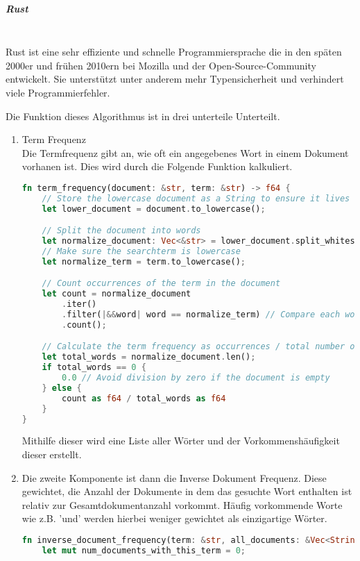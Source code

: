 \subparagraph{Rust}\mbox{}\\
Rust ist eine sehr effiziente und schnelle Programmiersprache die in den späten 2000er und frühen 2010ern bei Mozilla und der Open-Source-Community entwickelt. Sie unterstützt unter anderem mehr Typensicherheit und verhindert viele Programmierfehler.\cite{chatgpt}

Die Funktion dieses Algorithmus ist in drei unterteile Unterteilt.

\begin{enumerate}
    \item Term Frequenz \\
    Die Termfrequenz gibt an, wie oft ein angegebenes Wort in einem Dokument vorhanen ist. Dies wird durch die Folgende Funktion kalkuliert.
    
    \begin{lstlisting}[language=Rust]
fn term_frequency(document: &str, term: &str) -> f64 {
    // Store the lowercase document as a String to ensure it lives long enough
    let lower_document = document.to_lowercase(); 

    // Split the document into words
    let normalize_document: Vec<&str> = lower_document.split_whitespace().collect();
    // Make sure the searchterm is lowercase
    let normalize_term = term.to_lowercase();

    // Count occurrences of the term in the document
    let count = normalize_document
        .iter()
        .filter(|&&word| word == normalize_term) // Compare each word with the term
        .count();

    // Calculate the term frequency as occurrences / total number of words
    let total_words = normalize_document.len();
    if total_words == 0 {
        0.0 // Avoid division by zero if the document is empty
    } else {
        count as f64 / total_words as f64
    }
}\end{lstlisting}

    Mithilfe dieser wird eine Liste aller Wörter und der Vorkommenshäufigkeit dieser erstellt.

    \item Die zweite Komponente ist dann die Inverse Dokument Frequenz. Diese gewichtet, die Anzahl der Dokumente in dem das gesuchte Wort enthalten ist relativ zur Gesamtdokumentanzahl vorkommt. Häufig vorkommende Worte wie z.B. 'und' werden hierbei weniger gewichtet als einzigartige Wörter.

\begin{lstlisting}[language=Rust]
fn inverse_document_frequency(term: &str, all_documents: &Vec<String>) -> f64 {
    let mut num_documents_with_this_term = 0;


\end{lstlisting}
\end{enumerate}
